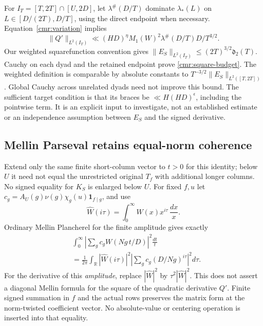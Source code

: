 \documentclass[11pt]{article}
\theoremstyle{definition}\newtheorem{definition}[theorem]{Definition}
\theoremstyle{remark}\newtheorem{remark}[theorem]{Remark}
\begin{document}
For $I_T=[T,2T]\cap[U,2D]$, let $\lambda^\#(D/T)$ dominate
$\lambda_*(L)$ on $L\in[D/(2T),D/T]$, using the direct endpoint
when necessary. Equation~\eqref{cmr:variation} implies
\[
 \|Q'\|_{L^2(I_T)}\ll(HD)^\eta M_1(W)^2
                         \lambda^\#(D/T)D/T^{3/2}.
\]
Our weighted squarefunction convention gives
$\|E_S\|_{L^2(I_T)}\le(2T)^{3/2}\mathfrak d_2(T)$.
Cauchy on each dyad and the retained endpoint prove
\eqref{cmr:square-budget}. The weighted definition is comparable by
absolute constants to $T^{-3/2}\|E_S\|_{L^2([T,2T])}$.
Global Cauchy across unrelated dyads need not improve this bound.
The sufficient target condition is that its braces be
$\ll H(HD)^\epsilon$, including the pointwise term. It is an explicit
input to investigate, not an established estimate or an independence
assumption between $E_S$ and the signed derivative.

\subsection{Mellin Parseval retains equal-norm coherence}\label{cmr:mellin}
Extend only the same finite short-column vector to $t>0$ for this
identity; below $U$ it need not equal the unrestricted original
$T_f$ with additional longer columns. No signed equality for $K_S$
is enlarged below $U$. For fixed $f,u$ let
$c_g=A_U(g)\nu(g)\chi_g(u)\mathbf1_{f\mid g}$, and use
\[
 \widehat W(i\tau)=\int_0^\infty W(x)x^{i\tau}\,\frac{dx}{x}.
\]
Ordinary Mellin Plancherel for the finite amplitude gives exactly
\begin{equation}\label{cmr:parseval}
 \begin{split}
 &\int_0^\infty\left|\sum_g c_gW(Ng\,t/D)\right|^2\frac{dt}{t}\\
 &=\frac1{2\pi}\int_{\mathbb R}|\widehat W(i\tau)|^2
                   \left|\sum_gc_g(D/Ng)^{i\tau}\right|^2d\tau.
 \end{split}
\end{equation}
For the derivative of this \emph{amplitude}, replace
$|\widehat W|^2$ by $\tau^2|\widehat W|^2$.
This does not assert a diagonal Mellin formula for the square of the
quadratic derivative $Q'$.
Finite signed summation in $f$ and the actual rows preserves the
matrix form at the norm-twisted coefficient vector. No absolute-value
or centering operation is inserted into that equality.
\end{document}

